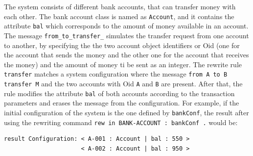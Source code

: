 The system consists of different bank accounts, that can transfer money with each other. The bank account class is named as \texttt{Account}, and it contains the attribute \texttt{bal} which corresponds to the amount of money available in an account. The message \texttt{from\_to\_transfer\_} simulates the transfer request from one account to another, by specifying the the two account object identifiers or Oid (one for the account that sends the money and the other one for the account that receives the money) and the amount of money ti be sent as an integer. The rewrite rule \texttt{transfer} matches a system configuration where the message \texttt{from A to B transfer M} and the two accounts with Oid \texttt{A} and \texttt{B} are present. After that, the rule modifies the attribute \texttt{bal} of both accounts according to the transaction parameters and erases the message from the configuration. For example, if the initial configuration of the system is the one defined by \texttt{bankConf}, the result after using the rewriting command \texttt{rew in BANK-ACCOUNT : bankConf .} would be:
\begin{lstlisting}
result Configuration: < A-001 : Account | bal : 550 > 
                      < A-002 : Account | bal : 950 >
\end{lstlisting}


